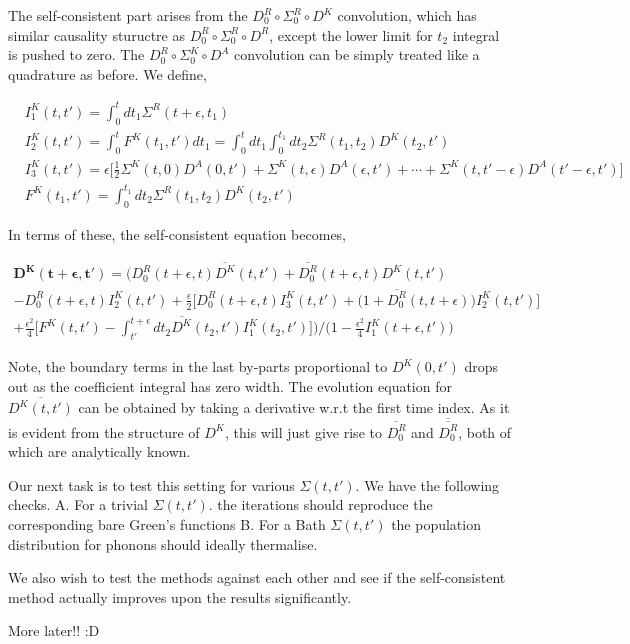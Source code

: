 \documentclass{amsart}
\begin{document}
      The self-consistent part arises from the $D_0^R\circ \Sigma_0^R\circ D^K$ convolution, which has similar causality stuructre as $D_0^R\circ \Sigma_0^R\circ D^R$, except the lower limit for $t_2$ integral is pushed to zero. The $D_0^R\circ \Sigma_0^K\circ D^A$ convolution can be simply treated like a quadrature as before. We define,
     
       
        \begin{align}
            & I^K_1(t,t')=\int^{t}_{0} dt_1  \Sigma^R (t+\epsilon,t_1)\\
            & I^K_2(t,t')=\int^{t}_{0}F^K(t_1,t')dt_1=\int^{t}_{0}dt_1\int^{t_1}_{0} dt_2  \Sigma^R (t_1,t_2) D^K(t_2, t')\\
            & I^K_3(t,t')=\epsilon\Big[\frac{1}{2}\Sigma^K (t,0) D^A(0, t')+\Sigma^K (t,\epsilon) D^A(\epsilon, t')+\cdots+\Sigma^K (t,t'-\epsilon) D^A(t'-\epsilon, t')\Big]\\
            & F^K(t_1,t')=\int^{t_1}_{0} dt_2  \Sigma^R (t_1,t_2) D^K(t_2, t')
        \end{align}
        
     In terms of these, the self-consistent equation becomes,
    
    \begin{multline}\label{selfconsitentKeldyshdyson2}
             \mathbf{D^K(t+\epsilon , t')} = \Bigg(D^R_0(t+\epsilon , t)\overline{D^K}(t , t')+\overline{D^R_0}(t+\epsilon , t)D^K(t , t')
                        \\  -D_0^R(t+\epsilon, t)I^K_2(t,t') +\frac{\epsilon}{2} \Big[D_0^R(t+\epsilon, t)I^K_3(t,t') + \Big(1+\overline{D_0^R}(t,t+\epsilon)\Big)I^K_2(t,t') \Big]
                        \\  +\frac{\epsilon^2}{4} 
                        \Big[ F^K(t,t') -\int^{t+\epsilon}_{t'} dt_2  \overline{D^K}(t_2 ,t')I^K_1(t_2,t')\Big]\Bigg)\Big/\Bigg(1-\frac{\epsilon^2}{4}I^K_1(t+\epsilon,t')\Bigg)
        \end{multline}
        
     Note, the boundary terms in the last by-parts proportional to $D^K(0,t')$ drops out as the coefficient integral has zero width. The evolution equation for $\overline{D^K(t,t')}$ can be obtained by taking a derivative w.r.t the first time index. As it is evident from the structure of $D^K$, this will just give rise to $\overline{D_0^R}$ and $\overline{\overline{D_0^R}}$, both of which are analytically known.
    
    Our next task is to test this setting for various $\Sigma(t,t').$ We have the following checks.
    A. For a trivial $\Sigma(t,t').$ the iterations should reproduce the corresponding bare Green's functions
    B. For a Bath $\Sigma(t,t')$ the population distribution for phonons should ideally thermalise.
    
    We also wish to test the methods against each other and see if the self-consistent method actually improves upon the results significantly.
    
    More later!! :D
    
    
\end{document}
